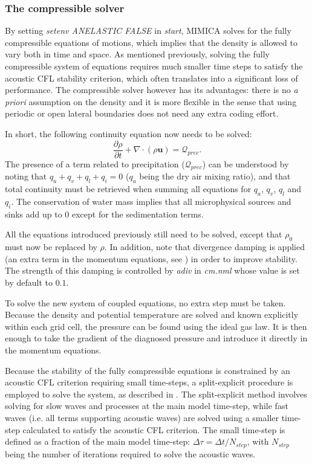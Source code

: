 \documentclass[12pt,A4,french]{article}
\begin{document}
\subsubsection{The compressible solver}
\label{compressible}

By setting {\it setenv ANELASTIC FALSE} in {\it start}, MIMICA solves for the fully compressible equations of motions, which implies that the density is allowed to vary both in time and space. As mentioned previously, solving the fully compressible system of equations requires much smaller time steps to satisfy the acoustic CFL stability criterion, which often translates into a significant loss of  performance. The compressible solver however has its advantages: there is no {\it a priori} assumption on the density and it is more flexible in the sense that using periodic or open lateral boundaries does not need any extra coding effort. 

In short, the following continuity equation now needs to be solved:
\begin{equation}
\frac{\partial \rho}{\partial t} + \nabla\cdot\left(\rho\mathbf{u}\right) = {\mathcal Q}_{prec}.
\end{equation}
The presence of a term related to precipitation (${\mathcal Q}_{prec}$) can be understood by noting that $q_a + q_v + q_l + q_i = 0$ ($q_a$ being the dry air mixing ratio), and that total continuity  must be retrieved when summing all equations for $q_a$, $q_v$, $q_l$ and $q_i$. The conservation of water mass implies that all microphysical sources and sinks add up to $0$ except for the sedimentation terms. 

All the equations introduced previously still need to be solved, except that $\rho_0$ must now be replaced by $\rho$. In addition, note that divergence damping is applied (an extra term in the momentum equations, see \cite{SK1992}) in order to improve stability. The strength of this damping is controlled by {\it adiv} in {\it cm.nml} whose value is set by default to $0.1$.

To solve the new system of coupled equations, no extra step must be taken. Because the density and potential temperature are solved and known explicitly within each grid cell, the pressure can be found using the ideal gas law. It is then enough to take the gradient of the diagnosed pressure and introduce it directly in the momentum equations.

Because the stability of the fully compressible equations is constrained by an acoustic CFL criterion requiring small time-steps, a split-explicit procedure is employed to solve the system, as described in \cite{Sat2003, Kal2007}. The split-explicit method involves solving for slow waves and processes at the main model time-step, while fast waves (i.e. all terms supporting acoustic waves) are solved using a smaller time-step calculated to satisfy the acoustic CFL criterion. The small time-step is defined as a fraction of the main model time-step: $\Delta \tau = \Delta t / N_{step}$, with $N_{step}$ being the number of iterations required to solve the acoustic waves. 
\end{document}
